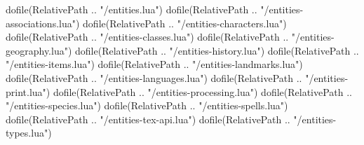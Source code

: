 
\begin{luacode*}
	dofile(RelativePath .. "/entities.lua")
	dofile(RelativePath .. "/entities-associations.lua")
	dofile(RelativePath .. "/entities-characters.lua")
	dofile(RelativePath .. "/entities-classes.lua")
	dofile(RelativePath .. "/entities-geography.lua")
	dofile(RelativePath .. "/entities-history.lua")
	dofile(RelativePath .. "/entities-items.lua")
	dofile(RelativePath .. "/entities-landmarks.lua")
	dofile(RelativePath .. "/entities-languages.lua")
	dofile(RelativePath .. "/entities-print.lua")
	dofile(RelativePath .. "/entities-processing.lua")
	dofile(RelativePath .. "/entities-species.lua")
	dofile(RelativePath .. "/entities-spells.lua")
	dofile(RelativePath .. "/entities-tex-api.lua")
	dofile(RelativePath .. "/entities-types.lua")
\end{luacode*}

\newcommand{\setDefaultLocation}[1]{
	\directlua{DefaultLocation = "#1"}
}

\newcommand{\resetCurrentLabels}{
	\setDefaultLocation{}
	\directlua{
		LogError("Use of deprecated function resetCurrentLabels.")
	}
}

\newcommand{\newEntity}[4]{
	\directlua{
		NewEntity("#1","#2", [[\detokenize{#3}]], [[\detokenize{#4}]])
	}
}

\newcommand{\newPlace}[3]{
	\newEntity{#1}{place}{#2}{#3}
}

\newcommand{\declarePC}[1]{
	\directlua{DeclarePC("#1")}
}

\newcommand{\newNPC}[3]{
	\directlua{
		NewCharacter("#1", [[\detokenize{#2}]], [[\detokenize{#3}]])
	}
}

\newcommand{\newGod}[3]{
	\newEntity{#1}{god}{#2}{#3}
	\setSpecies{gott}
}

\newcommand{\charappearance}[3]{
	\addDescriptor[Körper:]{Erscheinung}{#1}
	\addDescriptor[Kleidung und Ausrüstung:]{Erscheinung}{#2}
	\addDescriptor[Stimme / Verhalten:]{Erscheinung}{#3}
}

\newcommand{\newOrganisation}[3]{
	\newEntity{#1}{organisations}{#2}{#3}
}

\newcommand{\newFamily}[3]{
	\newEntity{#1}{families}{#2}{#3}
}

\newcommand{\newShip}[3]{
	\newEntity{#1}{ships}{#2}{#3}
}

\newcommand{\newSpecies}[3]{
	\newEntity{#1}{species}{#2}{#3}
}

\newcommand{\newLanguage}[3]{
	\newEntity{#1}{languages}{#2}{#3}
}

\newcommand{\newClass}[2]{
	\newEntity{#1}{classes}{}{#2}
}

